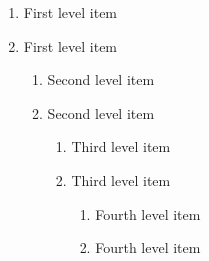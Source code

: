 \documentclass{book}
\renewcommand{\_}{\Texinfounderscore\discretionary{}{}{}}
\begin{document}
\begin{enumerate}[start=1]
   \item First level item
   \item First level item
\begin{enumerate}[start=1]
     \item Second level item
     \item Second level item
\begin{enumerate}[start=1]
       \item Third level item
       \item Third level item
\begin{enumerate}[start=1]
         \item Fourth level item
         \item Fourth level item
\end{enumerate}
\end{enumerate}
\end{enumerate}
\end{enumerate}
\end{document}
